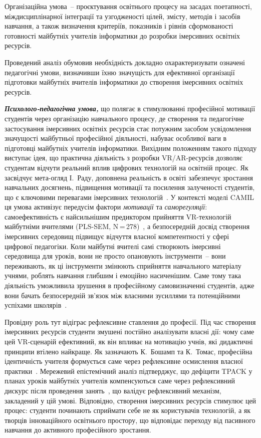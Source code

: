 Організаційна умова~-- проєктування освітнього процесу на засадах поетапності, міждисциплінарної інтеграції та узгодженості цілей, змісту, методів і засобів навчання, а також визначення критеріїв, показників і рівнів сформованості готовності майбутніх учителів інформатики до розробки імерсивних освітніх ресурсів.

Проведений аналіз обумовив необхідність докладно охарактеризувати означені педагогічні умови, визначивши їхню значущість для ефективної організації підготовки майбутніх вчителів інформатики до створення імерсивних освітніх ресурсів.

\emph{\textbf{Психолого-педагогічна умова,}} що полягає в стимулюванні професійної мотивації студентів через організацію навчального процесу, де створення та педагогічне застосування імерсивних освітніх ресурсів стає потужним засобом усвідомлення значущості майбутньої професійної діяльності, набуває особливої ваги в підготовці майбутніх учителів інформатики. Вихідним положенням такого підходу виступає ідея, що практична діяльність з розробки VR/AR-ресурсів дозволяє студентам відчути реальний вплив цифрових технологій на освітній процес. Як засвідчує мета-огляд І.~Раду, доповнена реальність в освіті забезпечує зростання навчальних досягнень, підвищення мотивації та посилення залученості студентів, що є ключовими перевагами імерсивних технологій~\cite{KMotivation2023}. У контексті моделі CAMIL ця умова активізує передусім фактори \emph{мотивації} та \emph{саморегуляції}: самоефективність є найсильнішим предиктором прийняття VR-технологій майбутніми вчителями (PLS-SEM, N\,=\,278)~\cite{Xie2024UTAUT2VR}, а безпосередній досвід створення імерсивних середовищ підвищує відчуття власної компетентності у сфері цифрової педагогіки. Коли майбутні вчителі самі створюють імерсивні середовища для уроків, вони не просто опановують інструменти~-- вони переживають, як ці інструменти змінюють сприйняття навчального матеріалу учнями, роблять навчання глибшим і емоційно насиченішим. Саме тому така діяльність уможливила зрушення в професійному самовизначенні студентів, адже вони бачать безпосередній зв'язок між власними зусиллями та потенційними успіхами школярів~\cite[c.~112]{Krokos2019Virtual}.

Провідну роль тут відіграє рефлексивне ставлення до професії. Під час створення імерсивних ресурсів студенти змушені постійно аналізувати власні дії: чому саме цей VR-сценарій ефективний, як він впливає на мотивацію учнів, які дидактичні принципи втілено найкраще. Як зазначають К.~Бошамп та К.~Томас, професійна ідентичність учителя формується саме через рефлексивне осмислення власної практики~\cite{ProfIdentity2024}. Мережевий епістемічний аналіз підтверджує, що дефіцити TPACK у планах уроків майбутніх учителів компенсуються саме через рефлексивний дискурс після проведення занять~\cite{Ga2024TPACKENA}, що валідує рефлексивний механізм, закладений у цій умові. Відповідно, створення імерсивних ресурсів стимулює цей процес: студенти починають сприймати себе не як користувачів технологій, а як творців інноваційного освітнього простору, що відповідає переходу від пасивного навчання до активного професійного зростання.

